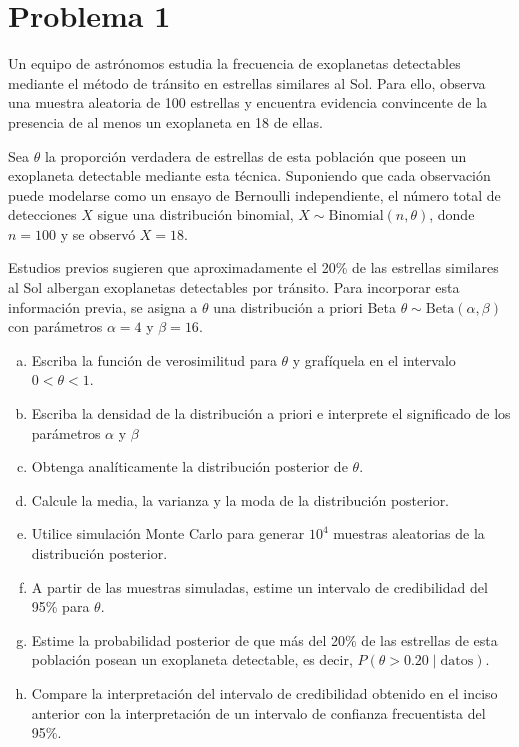 \documentclass[12pt]{article}
\begin{document}
\section{Problema 1}

Un equipo de astrónomos estudia la frecuencia de exoplanetas detectables mediante el método de tránsito en estrellas similares al Sol. Para ello, observa una muestra aleatoria de 100 estrellas y encuentra evidencia convincente de la presencia de al menos un exoplaneta en 18 de ellas.

Sea $\theta$ la proporción verdadera de estrellas de esta población que poseen un exoplaneta detectable mediante esta técnica. Suponiendo que cada observación puede modelarse como un ensayo de Bernoulli independiente, el número total de detecciones $X$ sigue una distribución binomial, $X \sim \text{Binomial}(n, \theta)$, donde $n = 100$ y se observó $X = 18$.

Estudios previos sugieren que aproximadamente el 20\% de las estrellas similares al Sol albergan exoplanetas detectables por tránsito. Para incorporar esta información previa, se asigna a $\theta$ una distribución a priori Beta $\theta \sim \text{Beta}(\alpha, \beta)$ con parámetros $\alpha = 4$ y $\beta = 16$.

\begin{enumerate}[a)]
    \item Escriba la función de verosimilitud para $\theta$ y grafíquela en el intervalo $0 < \theta < 1$.
    
    \item Escriba la densidad de la distribución a priori e interprete el significado de los parámetros $\alpha$ y $\beta$
    
    \item Obtenga analíticamente la distribución posterior de $\theta$.
    
    \item Calcule la media, la varianza y la moda de la distribución posterior.
    
    \item Utilice simulación Monte Carlo para generar $10^4$ muestras aleatorias de la distribución posterior.
    
    \item A partir de las muestras simuladas, estime un intervalo de credibilidad del 95\% para $\theta$.
    
    \item Estime la probabilidad posterior de que más del 20\% de las estrellas de esta población posean un exoplaneta detectable, es decir, $P(\theta > 0.20 \mid \text{datos})$.
    
    \item Compare la interpretación del intervalo de credibilidad obtenido en el inciso anterior con la interpretación de un intervalo de confianza frecuentista del 95\%.
\end{enumerate}
\end{document}
